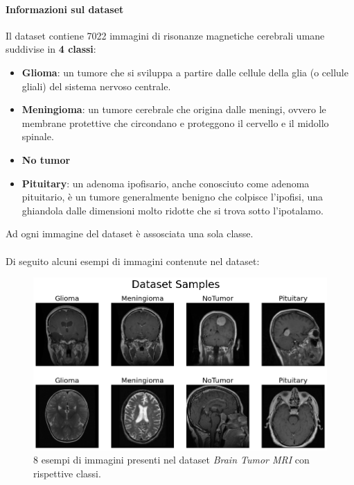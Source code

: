         \paragraph{Informazioni sul dataset}
        Il dataset \cite{Brain_Tumor_MRI_Dataset} contiene 7022 immagini di risonanze magnetiche cerebrali umane suddivise in \textbf{4 classi}:
            \begin{itemize}
                \item \textbf{Glioma}: un tumore che si sviluppa a partire dalle cellule della glia (o cellule gliali) del sistema nervoso centrale.
                \item \textbf{Meningioma}: un tumore cerebrale che origina dalle meningi, ovvero le membrane protettive che circondano e proteggono il cervello e il midollo spinale.
                \item \textbf{No tumor}
                \item \textbf{Pituitary}: un adenoma ipofisario, anche conosciuto come adenoma pituitario, è un tumore generalmente benigno che colpisce l’ipofisi, una ghiandola dalle dimensioni molto ridotte che si trova sotto l’ipotalamo.
            \end{itemize}
        
        Ad ogni immagine del dataset è assosciata una sola classe.\\\\
        \newpage
        Di seguito alcuni esempi di immagini contenute nel dataset:
            \begin{figure}[!h]
                \centering
                \includegraphics[width=\textwidth]{Images/Datasets/Brain Dataset Samples.png}
                \caption{8 esempi di immagini presenti nel dataset \textit{Brain Tumor MRI} con rispettive classi.}
                \label{Brain Samples}
            \end{figure}
        \newpage
        
